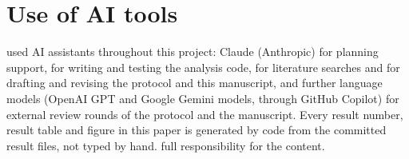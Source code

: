 \section*{Use of AI tools}
 used AI assistants throughout this project: Claude (Anthropic) for planning support, for writing and testing the analysis code, for literature searches and for drafting and revising the protocol and this manuscript, and further language models (OpenAI GPT and Google Gemini models, through GitHub Copilot) for external review rounds of the protocol and the manuscript. Every result number, result table and figure in this paper is generated by code from the committed result files, not typed by hand.  full responsibility for the content.

